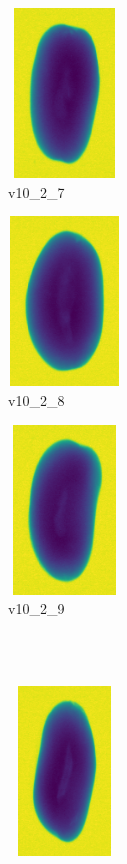 \documentclass[11pt]{article}
\begin{document}
\begin{figure}
\begin{subfigure}[b]{0.15\textwidth}
         \centering
         \includegraphics[width=3cm, height=4.5cm]{images/kartofler/v10_2_3_cut.png}
        \caption{v10\_2\_7}
         \label{fig:five over x}
     \end{subfigure}
     \hfill
    \begin{subfigure}[b]{0.15\textwidth}
         \centering
         \includegraphics[width=3cm, height=4.5cm]{images/kartofler/v10_2_4_cut.png}
        \caption{v10\_2\_8}
         \label{fig:five over x}
     \end{subfigure}
    \hfill
    \begin{subfigure}[b]{0.15\textwidth}
         \centering
         \includegraphics[width=3cm, height=4.5cm]{images/kartofler/v10_2_5_cut.png}
         \caption{v10\_2\_9}
         \label{fig:y equals x}
     \end{subfigure}
     \\ \\
     \begin{subfigure}[b]{0.15\textwidth}
         \centering
         \includegraphics[width=3cm, height=4.5cm]{images/kartofler/v10_2_6_cut.png}

\end{subfigure}
\end{figure}
\end{document}

